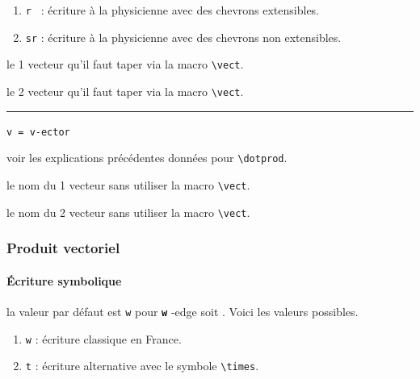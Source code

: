 \documentclass[12pt,a4paper]{book}
\makeatletter
\newcommand\env[1]{\texttt{#1}}
\newcommand\macro[1]{\env{\textbackslash{}#1}}
\theoremstyle{definition}
\newcommand\separation{
	\medskip
	\hfill\rule{0.5\textwidth}{0.75pt}\hfill
	\medskip
}
\newcommand\whyprefix[2]{%
	\textbf{\prefix{#1}}-#2%
}
\newcommand\mwhyprefix[2]{%
	\texttt{#1 = #1-#2}%
}
\newcommand\prefix[1]{%
	\texttt{#1}%
}
\newcommand\inenglish{\@ifstar{\@inenglish@star}{\@inenglish@no@star}}
\newcommand\@inenglish@star[1]{%
	\emph{\og #1 \fg}%
}
\newcommand\@inenglish@no@star[1]{%
	\@inenglish@star{#1} en anglais%
}
\makeatother
\begin{document}
{{\begin{enumerate}
	\medskip
	
	\item \verb+r + : écriture \og à la physicienne \fg{} avec des chevrons extensibles.

	\item \verb+sr+ : écriture \og à la physicienne \fg{} avec des chevrons non extensibles.

%
%
\end{enumerate}

 le 1\ier{} vecteur qu'il faut taper via la macro \macro{vect}.

 le 2\ieme{} vecteur qu'il faut taper via la macro \macro{vect}.


\separation


 \hfill \mwhyprefix{v}{ector}

\IDoption{} voir les explications précédentes données pour \macro{dotprod}.

 le nom du 1\ier{} vecteur sans utiliser la macro \macro{vect}.

 le nom du 2\ieme{} vecteur sans utiliser la macro \macro{vect}.


\subsubsection{Produit vectoriel}

\paragraph{Écriture symbolique}




\IDoption{} la valeur par défaut est \verb+w+ pour \whyprefix{w}{edge} soit \inenglish{coin}. Voici les valeurs possibles.

\begin{enumerate}
	\item \verb+w+ : écriture classique en France.

	\item \verb+t+ : écriture alternative avec le symbole \macro{times}.


\end{enumerate}}}
\end{document}
